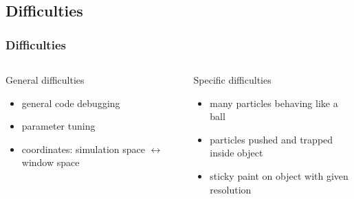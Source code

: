 \subsection{Difficulties}
\begin{frame}
	\frametitle{Difficulties}
	\begin{columns}[t]
		\begin{column}{0.5\textwidth}
			\begin{block}{General difficulties}
				\begin{itemize}
					\item general code debugging
					\item parameter tuning
					\item coordinates: simulation space $\leftrightarrow$ window space
				\end{itemize}
			\end{block}
		\end{column}
		\pause
		\begin{column}{0.5\textwidth}
			\begin{block}{Specific difficulties}
				\begin{itemize}
					\item many particles behaving like a ball
					\item particles pushed and trapped inside object
					\item sticky paint on object with given resolution
				\end{itemize}
			\end{block}
		\end{column}
	\end{columns}
\end{frame}
